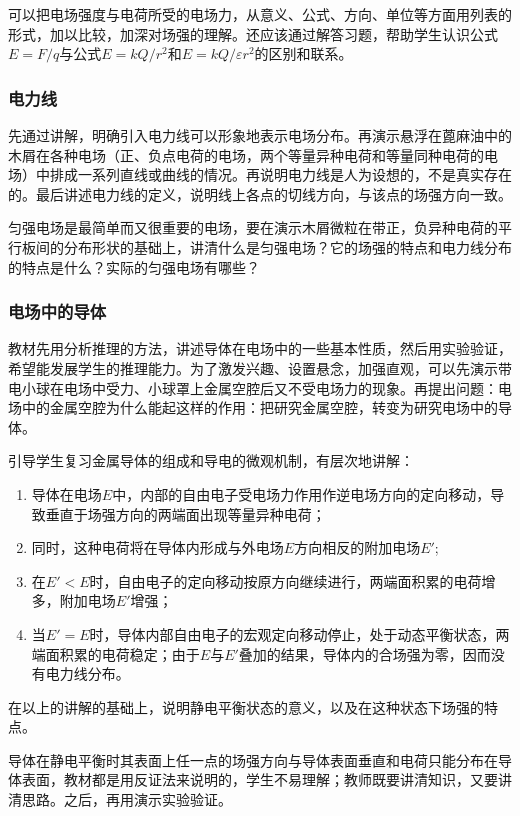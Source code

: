 可以把电场强度与电荷所受的电场力，从意义、公式、方向、单位等方面用列表的形式，加以比较，加深对场强的理解。还应该通过解答习题，帮助学生认识公式$E=F/q$与公式$E=kQ/r^2$和$E=kQ/\varepsilon r^2$的区别和联系。

\subsubsection{电力线}

先通过讲解，明确引入电力线可以形象地表示电场分布。再演示悬浮在蓖麻油中的木屑在各种电场（正、负点电荷的电场，两个等量异种电荷和等量同种电荷的电场）中排成一系列直线或曲线的情况。再说明电力线是人为设想的，不是真实存在的。最后讲述电力线的定义，说明线上各点的切线方向，与该点的场强方向一致。

匀强电场是最简单而又很重要的电场，要在演示木屑微粒在带正，负异种电荷的平行板间的分布形状的基础上，讲清什么是匀强电场？它的场强的特点和电力线分布的特点是什么？实际的匀强电场有哪些？

\subsubsection{电场中的导体}

教材先用分析推理的方法，讲述导体在电场中的一些基本性质，然后用实验验证，希望能发展学生的推理能力。为了激发兴趣、设置悬念，加强直观，可以先演示带电小球在电场中受力、小球罩上金属空腔后又不受电场力的现象。再提出问题：电场中的金属空腔为什么能起这样的作用：把研究金属空腔，转变为研究电场中的导体。

引导学生复习金属导体的组成和导电的微观机制，有层次地讲解：
\begin{enumerate}
\item 导体在电场$E$中，内部的自由电子受电场力作用作逆电场方向的定向移动，导致垂直于场强方向的两端面出现等量异种电荷；
\item 同时，这种电荷将在导体内形成与外电场$E$方向相反的附加电场$E'$;
\item 在$E'<E$时，自由电子的定向移动按原方向继续进行，两端面积累的电荷增多，附加电场$E'$增强；
\item 当$E'=E$时，导体内部自由电子的宏观定向移动停止，处于动态平衡状态，两端面积累的电荷稳定；由于$E$与$E'$叠加的结果，导体内的合场强为零，因而没有电力线分布。
\end{enumerate}
在以上的讲解的基础上，说明静电平衡状态的意义，以及在这种状态下场强的特点。

导体在静电平衡时其表面上任一点的场强方向与导体表面垂直和电荷只能分布在导体表面，教材都是用反证法来说明的，学生不易理解；教师既要讲清知识，又要讲清思路。之后，再用演示实验验证。

